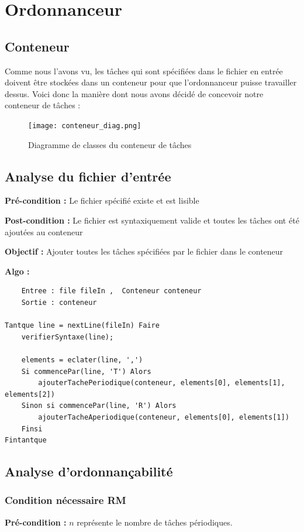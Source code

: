 	
	\section{Ordonnanceur}
		\subsection{Conteneur}
			Comme nous l'avons vu, les tâches qui sont spécifiées dans le fichier en entrée doivent être stockées dans un conteneur pour que l'ordonnanceur puisse travailler dessus. Voici donc la manière dont nous avons décidé de concevoir notre conteneur de tâches :
			\begin{figure}[!h]
				\centering
				\texttt{[image: conteneur\_diag.png]}
				\caption{Diagramme de classes du conteneur de tâches}
			\end{figure}
			\FloatBarrier
						
		\subsection{Analyse du fichier d'entrée}
				\textbf{Pré-condition :} Le fichier spécifié existe et est lisible
				
				\textbf{Post-condition :} Le fichier est syntaxiquement valide et toutes les tâches ont été ajoutées au conteneur
				
				\textbf{Objectif :} Ajouter toutes les tâches spécifiées par le fichier dans le conteneur
				
				\textbf{Algo :} 
					\begin{lstlisting}
	Entree : file fileIn ,  Conteneur conteneur
	Sortie : conteneur
	
Tantque line = nextLine(fileIn) Faire
	verifierSyntaxe(line);
	
	elements = eclater(line, ',')
	Si commencePar(line, 'T') Alors
		ajouterTachePeriodique(conteneur, elements[0], elements[1], elements[2])
	Sinon si commencePar(line, 'R') Alors
		ajouterTacheAperiodique(conteneur, elements[0], elements[1])
	Finsi
Fintantque
					\end{lstlisting}
		
		
		\subsection{Analyse d'ordonnançabilité}
			
			\subsubsection{Condition nécessaire RM}
				\textbf{Pré-condition :} $n$ représente le nombre de tâches périodiques.
				
